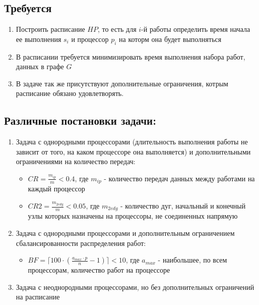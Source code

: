 \documentclass[12pt]{article}
\begin{document}
\subsection*{Требуется}
\begin{enumerate}
    \item Построить расписание $HP$, то есть для $i$-й работы определить время начала ее выполнения $s_i$ и процессор $p_i$ на которм она будет выполняться
    \item В расписании требуется минимизировать время выполнения набора работ, данных в графе $G$
    \item В задаче так же присутствуют дополнительные ограничения, котрым расписание обязано удовлетворять.
\end{enumerate}
\subsection*{Различные постановки задачи:}
\begin{enumerate}
    \item Задача с однородными процессорами (длительность выполнения работы не зависит от того, на каком процессоре она выполняется) и дополнительными ограничениями на количество передач:
          \begin{itemize}
              \item $CR = \frac{m_{ip}}{m} < 0.4$, где $m_{ip}$ - количество передач данных между работами на каждый процессор
              \item $CR2 = \frac{m_{2edg}}{m} < 0.05$, где $m_{2edg}$ - количество дуг, начальный и конечный узлы которых назначены на процессоры, не соединенных напрямую
          \end{itemize}
    \item Задача с однородными процессорами и дополнительным ограничением сбалансированности распределения работ:
          \begin{itemize}
              \item $BF = \lceil 100 \cdot \left( \frac{a_{max} \cdot p}{n} - 1 \right) \rceil < 10$, где $a_{max}$ - наибольшее, по всем процессорам, количество работ на процессоре
          \end{itemize}
    \item Задача с неоднородными процессорами, но без дополнительных ограничений на расписание
\end{enumerate}
\newpage
\end{document}
